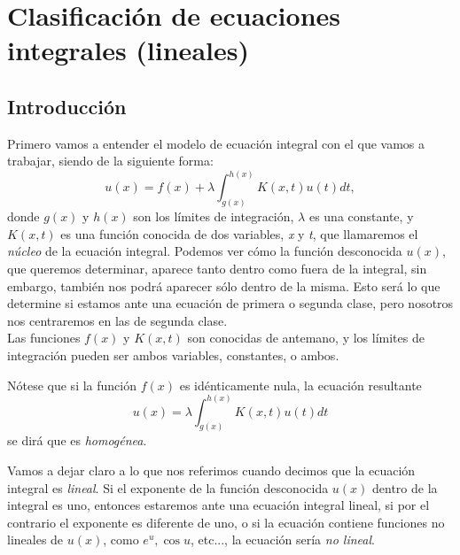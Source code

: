 
\chapter{Clasificación de ecuaciones integrales (lineales)}\label{ch:primer-capitulo}

\section{Introducción}
Primero vamos a entender el modelo de ecuación integral con el que vamos a trabajar, siendo de la siguiente forma:
\begin{equation}\label{}
	u(x) = f(x) + \lambda \int_{g(x)}^{h(x)} K(x,t)u(t)dt,
\end{equation}
donde $g(x)$ y $h(x)$ son los límites de integración, $\lambda$ es una constante, y $K(x,t)$ es una función conocida de dos variables, \textit{x} y \textit{t}, que llamaremos el \textit{núcleo} de la ecuación integral. Podemos ver cómo la función desconocida $u(x)$, que queremos determinar,  aparece tanto dentro como fuera de la integral, sin embargo, también nos podrá aparecer sólo dentro de la misma. Esto será lo que determine si estamos ante una ecuación de primera o segunda clase, pero nosotros nos centraremos en las de segunda clase.\\

Las funciones $f(x)$ y $K(x,t)$ son conocidas de antemano, y los límites de integración pueden ser ambos variables, constantes, o ambos.\\
\begin{observacion}
	Nótese que si la función $f(x)$ es idénticamente nula, la ecuación resultante 
	\begin{equation}\label{}
		u(x) = \lambda \int_{g(x)}^{h(x)} K(x,t)u(t)dt
	\end{equation}
	se dirá que es \textit{homogénea}.
\end{observacion}
\begin{observacion}
	Vamos a dejar claro a lo que nos referimos cuando decimos que la ecuación integral es \textit{lineal}. Si el exponente de la función desconocida $u(x)$ dentro de la integral es uno, entonces estaremos ante una ecuación integral lineal, si por el contrario el exponente es diferente de uno, o si la ecuación contiene funciones no lineales de $u(x)$, como $e^u, \cos u$, etc..., la ecuación sería \textit{no lineal}.
\end{observacion}

